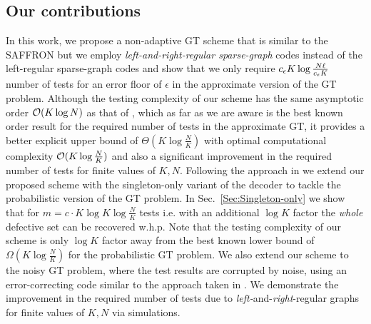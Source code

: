 \subsection*{Our contributions}
In this work\cite{vem2017group}, we propose a non-adaptive GT scheme that is similar to the SAFFRON but we employ \textit{left-and-right-regular sparse-graph} codes instead of the left-regular sparse-graph codes and show that we only require $c_{\epsilon} K\log \frac{N\ell}{c_{\epsilon} K}$ number of tests for an error floor of $\epsilon$ in the approximate version of the GT problem. Although the testing complexity of our scheme has the same asymptotic order $\mathcal{O}(K\log N)$ as that of \cite{lee2015saffron}, which as far as we are aware is the best known order result for the required number of tests in the approximate GT, it provides a better explicit upper bound of $\Theta(K\log \frac{N}{K})$ with optimal computational complexity $\mathcal{O}(K\log \frac{N}{K})$ and also a significant improvement in the required number of tests for finite values of $K,N$. 
Following the approach in \cite{lee2015saffron} we extend our proposed scheme with the singleton-only variant of the decoder to tackle the probabilistic version of the GT problem. In Sec.~\ref{Sec:Singleton-only} we show that for $m=c\cdot K\log K \log \frac{N}{K}$ tests i.e. with an additional $\log K$ factor the \textit{whole} defective set can be recovered w.h.p. Note that the testing complexity of our scheme is only $\log K$ factor away from the best known lower bound of $\Omega(K\log \frac{N}{K})$ \cite{chan2014non} for the probabilistic GT problem. We also extend our scheme to the noisy GT problem, where the test results are corrupted by noise, using an error-correcting code similar to the approach taken in \cite{lee2015saffron}. We demonstrate the improvement in the required number of tests due to \emph{left-}and-\emph{right}-regular graphs  for finite values of $K, N$ via simulations.

